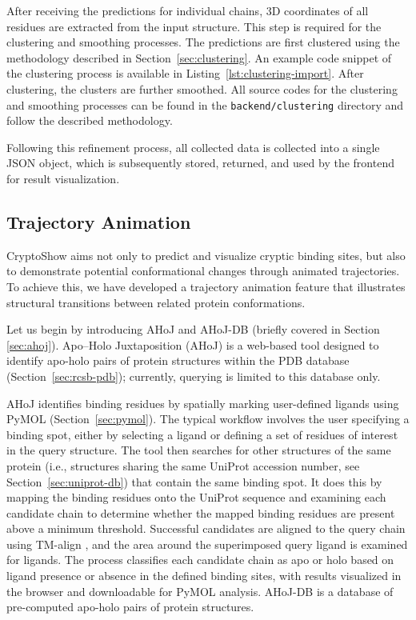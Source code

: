 After receiving the predictions for individual chains, 3D coordinates of all residues are extracted from the input structure. This step is required for the clustering and smoothing processes. The predictions are first clustered using the methodology described in Section~\ref{sec:clustering}. An example code snippet of the clustering process is available in Listing~\ref{lst:clustering-import}. After clustering, the clusters are further smoothed. All source codes for the clustering and smoothing processes can be found in the \lstinline|backend/clustering| directory and follow the described methodology.



Following this refinement process, all collected data is collected into a single JSON object, which is subsequently stored, returned, and used by the frontend for result visualization.

\subsection{Trajectory Animation}
\label{sec:trajectory}

CryptoShow aims not only to predict and visualize cryptic binding sites, but also to demonstrate potential conformational changes through animated trajectories. To achieve this, we have developed a trajectory animation feature that illustrates structural transitions between related protein conformations.

Let us begin by introducing AHoJ \cite{feidakis2022ahoj} and AHoJ-DB \cite{feidakis2024ahoj} (briefly covered in Section \ref{sec:ahoj}). Apo–Holo Juxtaposition (AHoJ) is a web-based tool designed to identify apo-holo pairs of protein structures within the PDB database (Section~\ref{sec:rcsb-pdb}); currently, querying is limited to this database only.

AHoJ identifies binding residues by spatially marking user-defined ligands using PyMOL (Section~\ref{sec:pymol}). The typical workflow involves the user specifying a binding spot, either by selecting a ligand or defining a set of residues of interest in the query structure. The tool then searches for other structures of the same protein (i.e., structures sharing the same UniProt accession number, see Section~\ref{sec:uniprot-db}) that contain the same binding spot. It does this by mapping the binding residues onto the UniProt sequence and examining each candidate chain to determine whether the mapped binding residues are present above a minimum threshold. Successful candidates are aligned to the query chain using TM-align \cite{zhang2005tm}, and the area around the superimposed query ligand is examined for ligands. The process classifies each candidate chain as apo or holo based on ligand presence or absence in the defined binding sites, with results visualized in the browser and downloadable for PyMOL analysis. AHoJ-DB is a database of pre-computed apo-holo pairs of protein structures.


